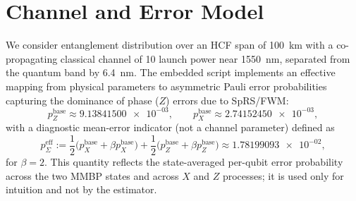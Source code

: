 \documentclass[conference]{IEEEtran}
\newcommand{\nexact}[1]{\num[round-mode=off]{#1}}
\newcommand{\simL}{100}
\newcommand{\simpcl}{10}
\newcommand{\simsep}{6.4}
\newcommand{\simpz}{9.13841500e-03}
\newcommand{\simpx}{2.74152450e-03}
\newcommand{\simpesum}{1.78199093e-02}
\begin{document}
\section{Channel and Error Model}\label{sec:channel}
We consider entanglement distribution over an HCF span of \SI{\simL}{\kilo\meter} with a co-propagating classical channel of \SI{\simpcl}{\dBm} launch power near \SI{1550}{\nano\meter}, separated from the quantum band by \SI{\simsep}{\nano\meter}. The embedded script implements an effective mapping from physical parameters to asymmetric Pauli error probabilities capturing the dominance of phase (\(Z\)) errors due to SpRS/FWM:
\begin{equation}
p_Z^{\text{base}} \approx \nexact{\simpz},\qquad p_X^{\text{base}} \approx \nexact{\simpx},
\end{equation}
with a diagnostic mean-error indicator (not a channel parameter) defined as
\begin{equation}
p_{\Sigma}^{\mathrm{eff}} := \frac{1}{2}\big(p_X^{\text{base}}+\beta p_X^{\text{base}}\big)+\frac{1}{2}\big(p_Z^{\text{base}}+\beta p_Z^{\text{base}}\big) \approx \nexact{\simpesum},
\end{equation}
for \(\beta=2\). This quantity reflects the state-averaged per-qubit error probability across the two MMBP states and across \(X\) and \(Z\) processes; it is used only for intuition and not by the estimator.
\end{document}
